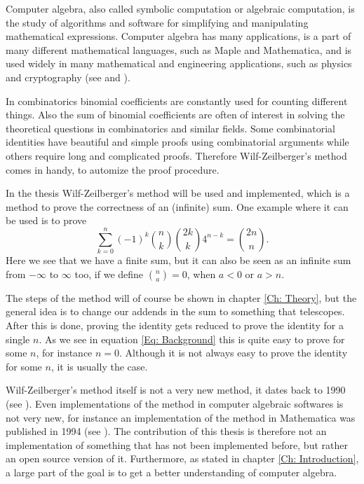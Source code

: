 Computer algebra, also called symbolic computation or algebraic computation, is the study of algorithms and software for simplifying and manipulating mathematical expressions. Computer algebra has many applications, is a part of many different mathematical languages, such as Maple and Mathematica, and is used widely in many mathematical and engineering applications, such as physics and cryptography (see  and ).

In combinatorics binomial coefficients are constantly used for counting different things. Also the sum of binomial coefficients are often of interest in solving the theoretical questions in combinatorics and similar fields. Some combinatorial identities have beautiful and simple proofs using combinatorial arguments while others require long and complicated proofs. Therefore Wilf-Zeilberger's method comes in handy, to automize the proof procedure.

In the thesis Wilf-Zeilberger's method will be used and implemented, which is a method to prove the correctness of an (infinite) sum. One example where it can be used is to prove
\begin{equation}\label{Eq: Background}
  \sum_{k=0}^n (-1)^k\binom{n}{k}\binom{2k}{k}4^{n-k}=\binom{2n}{n}.
\end{equation}
Here we see that we have a finite sum, but it can also be seen as an infinite sum from $-\infty$ to $\infty$ too, if we define $\binom{n}{a}=0$, when $a<0$ or $a>n$.

The steps of the method will of course be shown in chapter \ref{Ch: Theory}, but the general idea is to change our addends in the sum to something that telescopes. After this is done, proving the identity gets reduced to prove the identity for a single $n$. As we see in equation \eqref{Eq: Background} this is quite easy to prove for some $n$, for instance $n=0$. Although it is not always easy to prove the identity for some $n$, it is usually the case.

Wilf-Zeilberger's method itself is not a very new method, it dates back to 1990 (see ). Even implementations of the method in computer algebraic softwares is not very new, for instance an implementation of the method in Mathematica was published in 1994 (see ). The contribution of this thesis is therefore not an implementation of something that has not been implemented before, but rather an open source version of it. Furthermore, as stated in chapter \ref{Ch: Introduction}, a large part of the goal is to get a better understanding of computer algebra.
